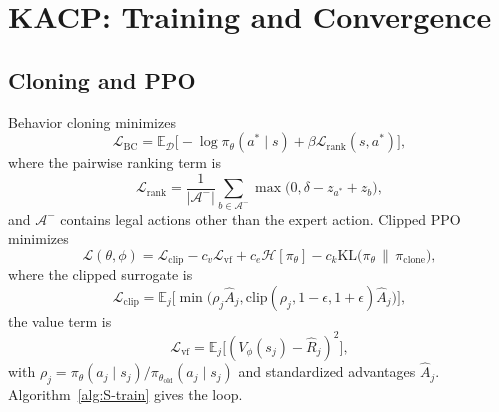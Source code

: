 \documentclass[conference]{IEEEtran}
\theoremstyle{remark}
\newcommand{\cA}{\mathcal{A}}
\newcommand{\cD}{\mathcal{D}}
\newcommand{\cL}{\mathcal{L}}
\begin{document}
\section{KACP: Training and Convergence}
\label{sec:S-train}

\subsection{Cloning and PPO}
\label{sec:S-bc}

Behavior cloning minimizes
\begin{equation}
\cL_{\mathrm{BC}}=\mathbb{E}_{\cD}\Big[-\log\pi_\theta(a^{*}\mid s)+\beta\cL_{\mathrm{rank}}(s,a^{*})\Big],
\label{eq:S-bc}
\end{equation}
where the pairwise ranking term is
\begin{equation}
\cL_{\mathrm{rank}}=\frac{1}{|\cA^{-}|}\sum_{b\in\cA^{-}}\max\big(0,\delta-z_{a^{*}}+z_b\big),
\label{eq:S-rank}
\end{equation}
and $\cA^{-}$ contains legal actions other than the expert action. Clipped PPO minimizes
\begin{equation}
\cL(\theta,\phi)=\cL_{\mathrm{clip}}-c_v\cL_{\mathrm{vf}}+c_e\mathcal{H}[\pi_\theta]-c_k\mathrm{KL}\big(\pi_\theta\,\|\,\pi_{\mathrm{clone}}\big),
\label{eq:S-ppo}
\end{equation}
where the clipped surrogate is
\begin{equation}
\cL_{\mathrm{clip}}=\mathbb{E}_j\Big[\min\big(\rho_j\hat{A}_j,\mathrm{clip}(\rho_j,1-\epsilon,1+\epsilon)\hat{A}_j\big)\Big],
\label{eq:S-clip}
\end{equation}
the value term is
\begin{equation}
\cL_{\mathrm{vf}}=\mathbb{E}_j\big[(V_\phi(s_j)-\hat{R}_j)^2\big],
\label{eq:S-vf}
\end{equation}
with $\rho_j=\pi_\theta(a_j\mid s_j)/\pi_{\theta_{\mathrm{old}}}(a_j\mid s_j)$ and standardized advantages $\hat{A}_j$. Algorithm~\ref{alg:S-train} gives the loop.
\end{document}
